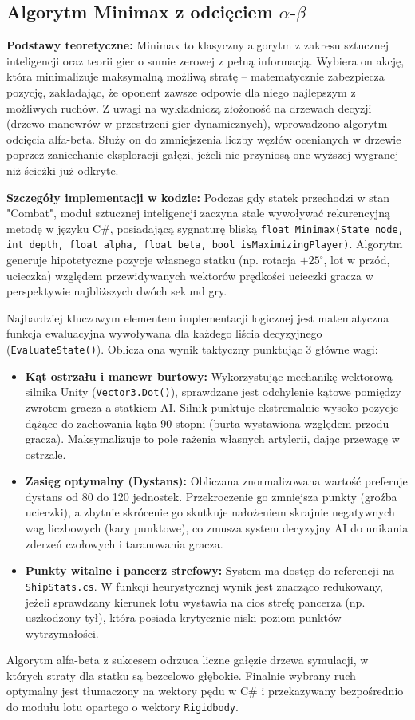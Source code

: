 \documentclass[12pt, a4paper]{article}
\begin{document}
\subsection{Algorytm Minimax z odcięciem $\alpha$-$\beta$}
\textbf{Podstawy teoretyczne:} Minimax to klasyczny algorytm z zakresu sztucznej inteligencji oraz teorii gier o sumie zerowej z pełną informacją. Wybiera on akcję, która minimalizuje maksymalną możliwą stratę – matematycznie zabezpiecza pozycję, zakładając, że oponent zawsze odpowie dla niego najlepszym z możliwych ruchów. Z uwagi na wykładniczą złożoność na drzewach decyzji (drzewo manewrów w przestrzeni gier dynamicznych), wprowadzono algorytm odcięcia alfa-beta. Służy on do zmniejszenia liczby węzłów ocenianych w drzewie poprzez zaniechanie eksploracji gałęzi, jeżeli nie przyniosą one wyższej wygranej niż ścieżki już odkryte.

\textbf{Szczegóły implementacji w kodzie:} 
Podczas gdy statek przechodzi w stan "Combat", moduł sztucznej inteligencji zaczyna stale wywoływać rekurencyjną metodę w języku C\#, posiadającą sygnaturę bliską \texttt{float Minimax(State node, int depth, float alpha, float beta, bool isMaximizingPlayer)}. Algorytm generuje hipotetyczne pozycje własnego statku (np. rotacja $+25^{\circ}$, lot w przód, ucieczka) względem przewidywanych wektorów prędkości ucieczki gracza w perspektywie najbliższych dwóch sekund gry.

Najbardziej kluczowym elementem implementacji logicznej jest matematyczna funkcja ewaluacyjna wywoływana dla każdego liścia decyzyjnego (\texttt{EvaluateState()}). Oblicza ona wynik taktyczny punktując 3 główne wagi:
\begin{itemize}
    \item \textbf{Kąt ostrzału i manewr burtowy:} Wykorzystując mechanikę wektorową silnika Unity (\texttt{Vector3.Dot()}), sprawdzane jest odchylenie kątowe pomiędzy zwrotem gracza a statkiem AI. Silnik punktuje ekstremalnie wysoko pozycje dążące do zachowania kąta 90 stopni (burta wystawiona względem przodu gracza). Maksymalizuje to pole rażenia własnych artylerii, dając przewagę w ostrzale.
    \item \textbf{Zasięg optymalny (Dystans):} Obliczana znormalizowana wartość preferuje dystans od 80 do 120 jednostek. Przekroczenie go zmniejsza punkty (groźba ucieczki), a zbytnie skrócenie go skutkuje nałożeniem skrajnie negatywnych wag liczbowych (kary punktowe), co zmusza system decyzyjny AI do unikania zderzeń czołowych i taranowania gracza.
    \item \textbf{Punkty witalne i pancerz strefowy:} System ma dostęp do referencji na \texttt{ShipStats.cs}. W funkcji heurystycznej wynik jest znacząco redukowany, jeżeli sprawdzany kierunek lotu wystawia na cios strefę pancerza (np. uszkodzony tył), która posiada krytycznie niski poziom punktów wytrzymałości.
\end{itemize}
Algorytm alfa-beta z sukcesem odrzuca liczne gałęzie drzewa symulacji, w których straty dla statku są bezcelowo głębokie. Finalnie wybrany ruch optymalny jest tłumaczony na wektory pędu w C\# i przekazywany bezpośrednio do modułu lotu opartego o wektory \texttt{Rigidbody}.
\end{document}
